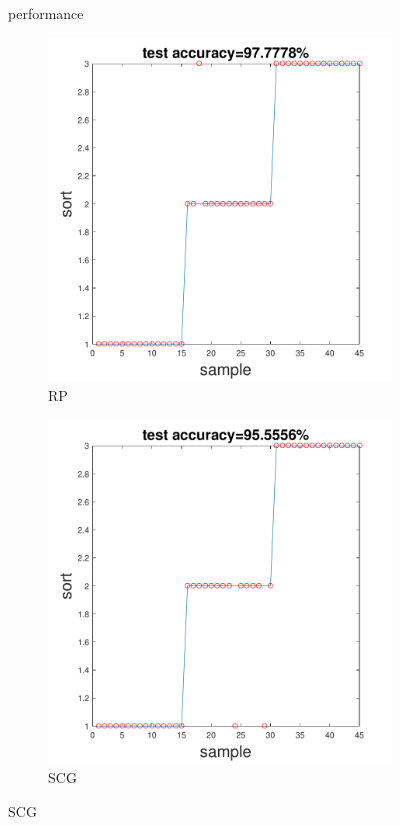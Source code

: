 \documentclass[12pt,a4paper]{article}
\begin{document}
\begin{CJK}{UTF8}{bsmi}
\begin{enumerate}
\begin{enumerate}
\begin{figure}[H]
\begin{subfigure}{.5\textwidth}
			\end{subfigure}
			\caption{performance}
			
		\end{figure}
	
		\begin{figure}[H]
		\centering
		\begin{subfigure}{.5\textwidth}
			\centering
			\includegraphics[width=1.05\linewidth]{iris_rp}
			\caption{RP}
			
		\end{subfigure}%
		\begin{subfigure}{.5\textwidth}
			\centering
			\includegraphics[width=1.05\linewidth]{iris_scg}
			\caption{SCG}
			

\end{subfigure}
\end{figure}
\end{enumerate}
\end{enumerate}
\end{CJK}
\end{document}
